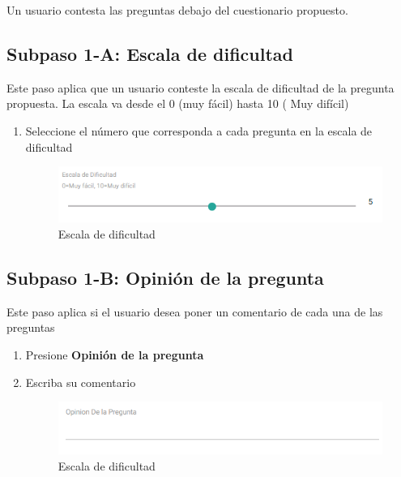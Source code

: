 Un usuario contesta las preguntas debajo del cuestionario propuesto.

\subsection{Subpaso 1-A: Escala de dificultad}
Este paso aplica que  un usuario conteste la escala de dificultad de la pregunta propuesta. 
La escala va desde el 0 (muy fácil) hasta 10 ( Muy difícil) 
\begin{enumerate}
	\item Seleccione el número que corresponda a cada pregunta  en la escala de
	 dificultad
   
    \begin{figure}[hbtp]
	\includegraphics[scale=0.6]{images/Interfaz/IUGS-3escaladificultad.png}
	\caption{Escala de dificultad}
	\end{figure}
\end{enumerate}


\subsection{Subpaso 1-B: Opinión de la pregunta}
Este paso aplica si el usuario desea poner un comentario de cada una de las preguntas
\begin{enumerate}
	\item Presione \textbf{Opinión de la pregunta}
	\item Escriba su comentario
	\begin{figure}[hbtp]
	\includegraphics[scale=0.6]{images/Interfaz/IUGS-3opinionPregunta.png}
	\caption{Escala de dificultad}
	\end{figure}
\end{enumerate}